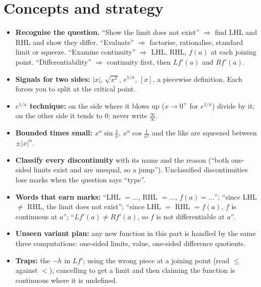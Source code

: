 \section{Concepts and strategy}
\begin{itemize}
\item \textbf{Recognise the question.} ``Show the limit does not exist'' $\Rightarrow$ find LHL and RHL and show they differ. ``Evaluate'' $\Rightarrow$ factorise, rationalise, standard limit or squeeze. ``Examine continuity'' $\Rightarrow$ LHL, RHL, $f(a)$ at each joining point. ``Differentiability'' $\Rightarrow$ continuity first, then $Lf'(a)$ and $Rf'(a)$.
\item \textbf{Signals for two sides:} $|x|$, $\sqrt{x^2}$, $e^{1/x}$, $[x]$, a piecewise definition. Each forces you to split at the critical point.
\item \textbf{$e^{1/x}$ technique:} on the side where it blows up ($x\to0^+$ for $e^{1/x}$) divide by it; on the other side it tends to $0$; never write $\frac\infty\infty$.
\item \textbf{Bounded times small:} $x^n\sin\frac1x$, $x^n\cos\frac1{x^2}$ and the like are squeezed between $\pm|x|^n$.
\item \textbf{Classify every discontinuity} with its name and the reason (``both one-sided limits exist and are unequal, so a jump''). Unclassified discontinuities lose marks when the question says ``type''.
\item \textbf{Words that earn marks:} ``LHL $=\dots$, RHL $=\dots$, $f(a)=\dots$''; ``since LHL $\ne$ RHL, the limit does not exist''; ``since LHL $=$ RHL $=f(a)$, $f$ is continuous at $a$''; ``$Lf'(a)\ne Rf'(a)$, so $f$ is not differentiable at $a$''.
\item \textbf{Unseen variant plan:} any new function in this part is handled by the same three computations: one-sided limits, value, one-sided difference quotients.
\item \textbf{Traps:} the $-h$ in $Lf'$; using the wrong piece at a joining point (read $\le$ against $<$); cancelling to get a limit and then claiming the function is continuous where it is undefined.
\end{itemize}

